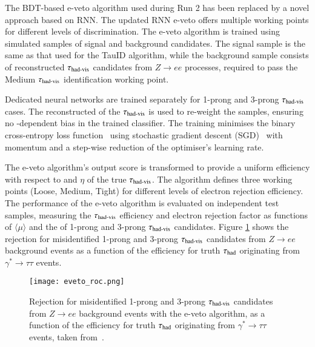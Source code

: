         The BDT-based e-veto algorithm used during Run 2 has been replaced by a novel approach based on RNN. 
        The updated RNN e-veto  offers multiple 
        working points for different levels of discrimination.
        The e-veto algorithm is trained using simulated samples of signal and background candidates. The signal sample is 
        the same as that used for the TauID algorithm, while the background sample consists of reconstructed
        $\tau_{\text{had-vis}}$ candidates from \(Z \rightarrow ee\) processes, required to pass the Medium 
        $\tau_{\text{had-vis}}$ identification working point.
    
        Dedicated neural networks are trained separately for 1-prong and 3-prong $\tau_{\text{had-vis}}$ cases. 
        The reconstructed \pT of the $\tau_{\text{had-vis}}$ is used to re-weight the samples, ensuring 
        no \pT-dependent bias in the trained classifier. The training minimises the binary cross-entropy 
        loss function~\cite{mao2023crossentropylossfunctionstheoretical} using stochastic gradient descent (SGD)~\cite{ruder2016overview}
        with momentum and a step-wise reduction of the optimiser's learning rate.
    
        The e-veto algorithm's output score is transformed to provide a uniform efficiency with respect 
        to \pt and \(\eta\) of the true \(\tau_{\text{had-vis}}\). The algorithm defines three working 
        points (Loose, Medium, Tight) for different levels of electron rejection efficiency.
        The performance of the e-veto algorithm is evaluated on independent test samples, measuring the 
        $\tau_{\text{had-vis}}$ efficiency and electron rejection factor as functions of $\langle \mu \rangle$ and the \pt of 
        1-prong and 3-prong $\tau_{\text{had-vis}}$ candidates.
        Figure \ref{fig:eveto_eff} shows the rejection for misidentified 1-prong and 3-prong $\tau_{\text{had-vis}}$ candidates from $Z\rightarrow ee$
        background events as a function of the efficiency for truth $\tau_{\text{had}}$ originating from $\gamma^*\rightarrow\tau\tau$ events.
        \begin{figure}[htbp]
            \centering
            \texttt{[image: eveto\_roc.png]}
            \caption{
                Rejection for misidentified 1-prong and 3-prong $\tau_{\text{had-vis}}$ candidates from $Z\rightarrow ee$
                background events with the e-veto algorithm,
                as a function of the efficiency for truth $\tau_{\text{had}}$ originating from $\gamma^*\rightarrow\tau\tau$ events, taken from~\cite{ATL-PHYS-PUB-2022-044}.
            }
            \label{fig:eveto_eff}
        \end{figure}

